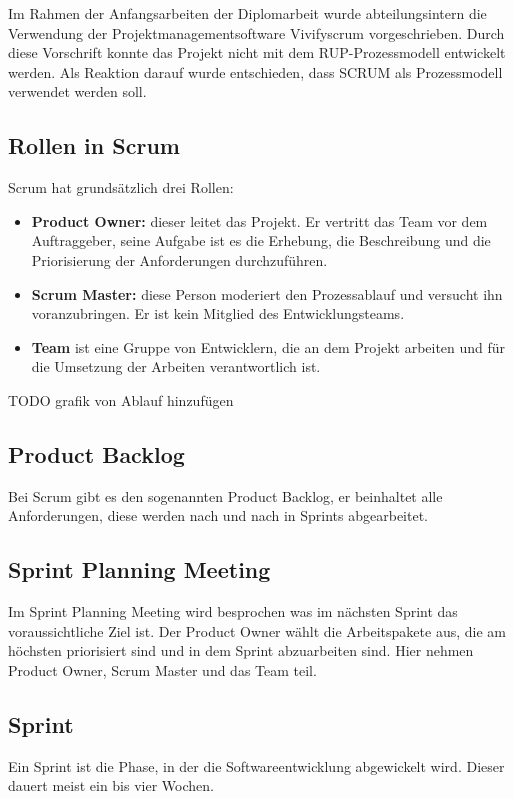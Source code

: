 	Im Rahmen der Anfangsarbeiten der Diplomarbeit wurde abteilungsintern die Verwendung der Projektmanagementsoftware Vivifyscrum vorgeschrieben. Durch diese Vorschrift konnte das Projekt nicht mit dem RUP-Prozessmodell entwickelt werden. 
Als Reaktion darauf wurde entschieden, dass SCRUM als Prozessmodell verwendet werden soll.

		\subsection{Rollen in Scrum}
		Scrum hat grundsätzlich drei Rollen:
		
		\begin{itemize} 
			\item \textbf{Product Owner:} dieser leitet das Projekt. Er vertritt das Team vor dem Auftraggeber, seine Aufgabe ist es die Erhebung, die Beschreibung und die Priorisierung der Anforderungen durchzuführen.
			\item \textbf{Scrum Master:} diese Person moderiert den Prozessablauf und versucht ihn voranzubringen. Er ist kein Mitglied des Entwicklungsteams.
			\item \textbf{Team} ist eine Gruppe von Entwicklern, die an dem Projekt arbeiten und für die Umsetzung der Arbeiten verantwortlich ist.
		\end{itemize}
		
		TODO grafik von Ablauf hinzufügen
		
		\subsection{Product Backlog}
		Bei Scrum gibt es den sogenannten Product Backlog, er beinhaltet alle Anforderungen, diese werden nach und nach in Sprints abgearbeitet.
		\subsection{Sprint Planning Meeting}
		Im Sprint Planning Meeting wird besprochen was im nächsten Sprint das voraussichtliche Ziel ist. Der Product Owner wählt die Arbeitspakete aus, die am höchsten priorisiert sind und in dem Sprint abzuarbeiten sind. Hier nehmen Product Owner, Scrum Master und das Team teil. 
		\subsection{Sprint}
		Ein Sprint ist die Phase, in der die Softwareentwicklung abgewickelt wird. Dieser dauert meist ein bis vier Wochen. 

